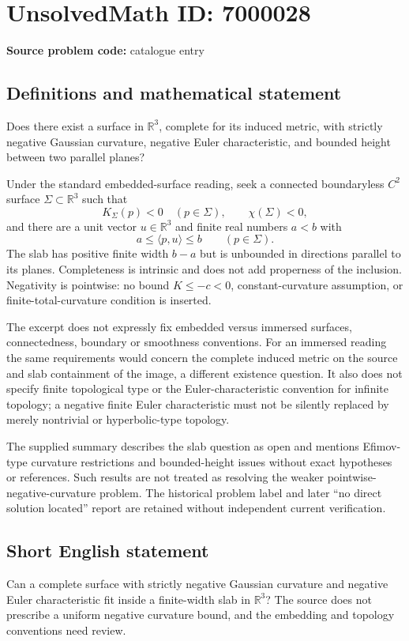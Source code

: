 \documentclass[11pt]{article}
\begin{document}
\section*{UnsolvedMath ID: 7000028}
\textbf{Source problem code:} catalogue entry
\subsection{Definitions and mathematical statement}
Does there exist a surface in \(\mathbb R^3\), complete for its induced metric, with strictly negative Gaussian curvature, negative Euler characteristic, and bounded height between two parallel planes?

Under the standard embedded-surface reading, seek a connected boundaryless \(C^2\) surface \(\Sigma\subset\mathbb R^3\) such that
\[
 K_\Sigma(p)<0\quad(p\in\Sigma),\qquad\chi(\Sigma)<0,
\]
and there are a unit vector \(u\in\mathbb R^3\) and finite real numbers \(a<b\) with
\[
 a\le\langle p,u\rangle\le b\qquad(p\in\Sigma).
\]
The slab has positive finite width \(b-a\) but is unbounded in directions parallel to its planes. Completeness is intrinsic and does not add properness of the inclusion. Negativity is pointwise: no bound \(K\le-c<0\), constant-curvature assumption, or finite-total-curvature condition is inserted.

The excerpt does not expressly fix embedded versus immersed surfaces, connectedness, boundary or smoothness conventions. For an immersed reading the same requirements would concern the complete induced metric on the source and slab containment of the image, a different existence question. It also does not specify finite topological type or the Euler-characteristic convention for infinite topology; a negative finite Euler characteristic must not be silently replaced by merely nontrivial or hyperbolic-type topology.

The supplied summary describes the slab question as open and mentions Efimov-type curvature restrictions and bounded-height issues without exact hypotheses or references. Such results are not treated as resolving the weaker pointwise-negative-curvature problem. The historical problem label and later ``no direct solution located'' report are retained without independent current verification.
\subsection{Short English statement}
Can a complete surface with strictly negative Gaussian curvature and negative Euler characteristic fit inside a finite-width slab in \(\mathbb R^3\)? The source does not prescribe a uniform negative curvature bound, and the embedding and topology conventions need review.
\end{document}
